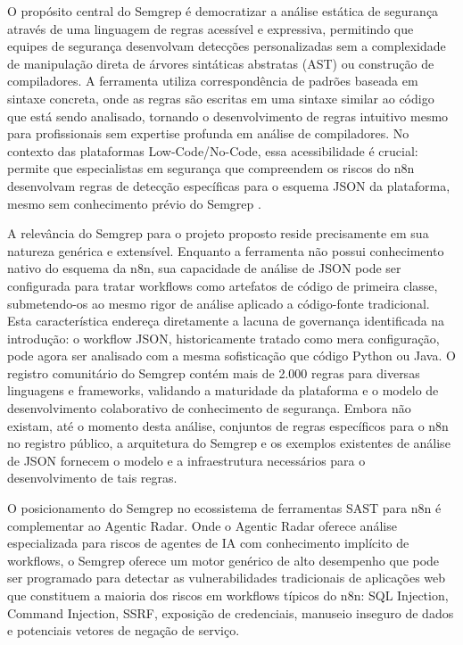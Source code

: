 \documentclass{sftex}
\begin{document}
O propósito central do Semgrep é democratizar a análise estática de segurança através de uma linguagem de regras acessível e expressiva, permitindo que equipes de segurança desenvolvam detecções personalizadas sem a complexidade de manipulação direta de árvores sintáticas abstratas (AST) ou construção de compiladores. A ferramenta utiliza correspondência de padrões baseada em sintaxe concreta, onde as regras são escritas em uma sintaxe similar ao código que está sendo analisado, tornando o desenvolvimento de regras intuitivo mesmo para profissionais sem expertise profunda em análise de compiladores. No contexto das plataformas Low-Code/No-Code, essa acessibilidade é crucial: permite que especialistas em segurança que compreendem os riscos do n8n desenvolvam regras de detecção específicas para o esquema JSON da plataforma, mesmo sem conhecimento prévio do Semgrep \cite{semgrep_custom_rules}.

A relevância do Semgrep para o projeto proposto reside precisamente em sua natureza genérica e extensível. Enquanto a ferramenta não possui conhecimento nativo do esquema da n8n, sua capacidade de análise de JSON pode ser configurada para tratar workflows como artefatos de código de primeira classe, submetendo-os ao mesmo rigor de análise aplicado a código-fonte tradicional. Esta característica endereça diretamente a lacuna de governança identificada na introdução: o workflow JSON, historicamente tratado como mera configuração, pode agora ser analisado com a mesma sofisticação que código Python ou Java. O registro comunitário do Semgrep contém mais de 2.000 regras para diversas linguagens e frameworks, validando a maturidade da plataforma e o modelo de desenvolvimento colaborativo de conhecimento de segurança. Embora não existam, até o momento desta análise, conjuntos de regras específicos para o n8n no registro público, a arquitetura do Semgrep e os exemplos existentes de análise de JSON fornecem o modelo e a infraestrutura necessários para o desenvolvimento de tais regras.

O posicionamento do Semgrep no ecossistema de ferramentas SAST para n8n é complementar ao Agentic Radar. Onde o Agentic Radar oferece análise especializada para riscos de agentes de IA com conhecimento implícito de workflows, o Semgrep oferece um motor genérico de alto desempenho que pode ser programado para detectar as vulnerabilidades tradicionais de aplicações web que constituem a maioria dos riscos em workflows típicos do n8n: SQL Injection, Command Injection, SSRF, exposição de credenciais, manuseio inseguro de dados e potenciais vetores de negação de serviço.
\end{document}
